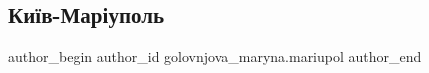  
 
 
 
 

\subsection{Київ-Маріуполь}
\label{sec:08_04_2022.fb.golovnjova_maryna.mariupol.1.ki_v_mar_upol}

\ifcmt
 author_begin
   author_id golovnjova_maryna.mariupol
 author_end
\fi
